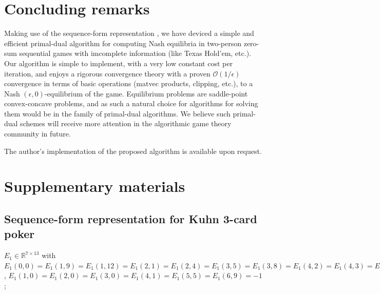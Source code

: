 \documentclass{article} %
\begin{document}
\section{Concluding remarks}
Making use of the sequence-form representation
\cite{koller1992complexity,von1996efficient,vonequilibrium}, we have
deviced a simple and efficient primal-dual algorithm for computing
Nash equilibria in two-person zero-sum sequential games with
imcomplete information (like Texas Hold'em, etc.). Our algorithm is
simple to implement, with a very low constant cost per iteration, and
enjoys a rigorous convergence theory with a proven
$\mathcal{O}(1/\epsilon)$ convergence in terms of basic operations
(matvec products, clipping, etc.), to a Nash
$(\epsilon,0)$-equilibrium of the game. Equilibrium problems are
saddle-point convex-concave problems, and as
such a natural choice for algorithms for solving them would be in the
family of primal-dual algorithms. We believe such primal-dual
schemes will receive more attention in the algorithmic game theory
community in future.

The author's implementation of the proposed algorithm is available
upon request.





\section{Supplementary materials}
\subsection{Sequence-form representation for Kuhn 3-card poker}
$E_1 \in \mathbb{R}^{7 \times 13}$ with $E_1(0,0) = E_1(1,9) =
E_1(1,12) = E_1(2,1) = E_1(2,4) = E_1(3,5) =
E_1(3,8) = E_1(4,2) = E_1(4,3) = E_1(5,6) = E_1(5,7) = E_1(6,10) =
E_1(6,11) = {1}$, $E_1(1,0) = E_1(2,0) = E_1(3,0) = E_1(4,1) =
E_1(5,5) = E_1(6,9) = {-1}$; \\
\end{document}
